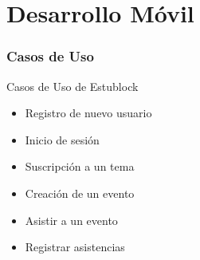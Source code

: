 \documentclass[usenames,dvipsnames]{beamer}
\begin{document}
\begin{frame}
\begin{columns}
\begin{column}{0.4\textwidth}
  \end{column}
  \end{columns}
\end{frame}


\section{Desarrollo Móvil}

\begin{frame} 
\frametitle{Casos de Uso} 
  \begin{block}{Casos de Uso de Estublock}
     \begin{itemize}
      \item Registro de nuevo usuario
      \item Inicio de sesión
      \item Suscripción a un tema
      \item Creación de un evento
      \item Asistir a un evento
      \item Registrar asistencias
    \end{itemize}
  \end{block}
\end{frame} 
\end{document}
